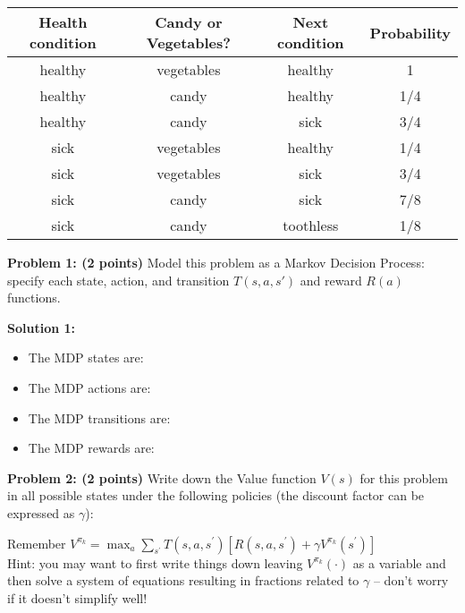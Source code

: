 \documentclass[]{article}
\begin{document}
\begin{table}[htb]
\centering
    \begin{tabular}{|c|c|c|c|}
      \hline
        Health condition &	Candy or Vegetables? &	Next condition & Probability \\\hline
        healthy &	vegetables &	healthy & 	1 \\\hline
        healthy &	candy &	healthy & 	1/4 \\\hline
        healthy &	candy &	sick & 	3/4 \\\hline
        sick &	vegetables &	healthy & 	1/4 \\\hline
        sick &	vegetables &	sick & 	3/4 \\\hline
        sick &	candy &	sick & 	7/8 \\\hline
        sick &	candy &	toothless & 	1/8 \\\hline
    \end{tabular}
\end{table}

\textbf{Problem 1: (2 points)}
Model this problem as a Markov Decision Process: specify each state, action, and transition $T(s,a,s')$ and reward $R(a)$ functions.

\bigskip

\textbf{Solution 1:}
\begin{itemize}
    \item The MDP states are:
    \item The MDP actions are:
    \item The MDP transitions are:
    \item The MDP rewards are:
\end{itemize}

\clearpage
\textbf{Problem 2: (2 points)}
Write down the Value function $V(s)$ for this problem in all possible states under the following policies (the discount factor can be expressed as $\gamma$):

Remember $V^{\pi_k} = \max_a \sum_{s^\prime} T(s,a,s^{\prime})\left[R(s,a,s^\prime) + \gamma V^{\pi_k}(s^\prime)\right]$\\

Hint: you may want to first write things down leaving $V^{\pi_k}(\cdot)$ as a variable and then solve a system of equations resulting in fractions related to $\gamma$ -- don't worry if it doesn't simplify well!
\end{document}
